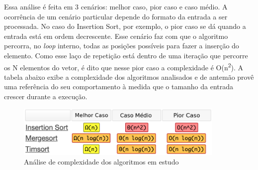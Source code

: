 Essa análise é feita em 3 cenários: melhor caso, pior caso e caso médio. A ocorrência de um cenário particular depende do formato da entrada a ser processada. No caso do Insertion Sort, por exemplo, o pior caso se dá quando a entrada está em ordem decrescente. Esse cenário faz com que o algoritmo percorra, no \textit{loop} interno, todas as posições possíveis para fazer a inserção do elemento. Como esse laço de repetição está dentro de uma iteração que percorre os N elementos do vetor, é dito que nesse pior caso a complexidade é O(n\textsuperscript{2}). A tabela abaixo exibe a complexidade dos algoritmos analisados e de antemão provê uma referência do seu comportamento à medida que o tamanho da entrada crescer durante a execução.

\begin{figure}[!htb]
\centering
\includegraphics[width=10cm]{img/complexidade.png}
\caption{Análise de complexidade dos algoritmos em estudo}
\label{fig:complexidade}
\end{figure}
